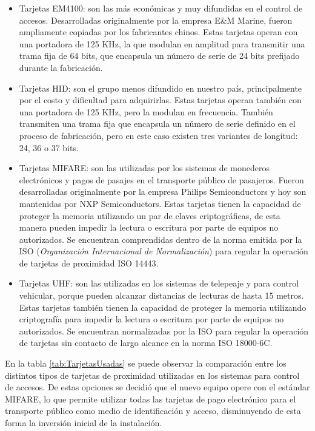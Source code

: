 \begin{itemize}
	\item Tarjetas EM4100: son las más económicas y muy difundidas en el control de accesos. Desarrolladas originalmente por la empresa E\&M Marine\cite{em_microelectronic_em4100_nodate}, fueron ampliamente copiadas por los fabricantes chinos. Estas tarjetas operan con una portadora de 125 KHz, la que modulan en amplitud para transmitir una trama fija de 64 bits, que encapsula un número de serie de 24 bits prefijado durante la fabricación.
	
	\item Tarjetas HID: son el grupo menos difundido en nuestro país, principalmente por el costo y dificultad para adquirirlas. Estas tarjetas operan también con una portadora de 125 KHz, pero la modulan en frecuencia. También transmiten una trama fija que encapsula un número de serie definido en el proceso de fabricación, pero en este caso existen tres variantes de longitud: 24, 36 o 37 bits\cite{hid_global_corporation_hid_nodate}.
	
	\item Tarjetas MIFARE: son las utilizadas por los sistemas de monederos electrónicos y pagos de pasajes en el transporte público de pasajeros. Fueron desarrolladas originalmente por la empresa Philips Semiconductors y hoy son mantenidas por NXP Semiconductors\cite{noauthor_mifare_2019}. Estas tarjetas tienen la capacidad de proteger la memoria utilizando un par de claves criptográficas, de esta manera pueden impedir la lectura o escritura por parte de equipos no autorizados. Se encuentran comprendidas dentro de la norma emitida por la ISO (\emph{Organización Internacional de Normalización}) para regular la operación de tarjetas de proximidad ISO 14443\cite{international_organization_for_standardization_iso_nodate}.
	
	\item Tarjetas UHF: son las utilizadas en los sistemas de telepeaje y para control vehicular, porque pueden alcanzar distancias de lecturas de hasta 15 metros. Estas tarjetas también tienen la capacidad de proteger la memoria utilizando criptografía para impedir la lectura o escritura por parte de equipos no autorizados. Se encuentran normalizadas por la ISO para regular la operación de tarjetas sin contacto de largo alcance en la norma ISO 18000-6C\cite{international_organization_for_standardization_isoiec_nodate}.
\end{itemize}

En la tabla \ref{tab:TarjetasUsadas} se puede observar la comparación entre los distintos tipos de tarjetas de proximidad utilizadas en los sistemas para control de accesos. De estas opciones se decidió que el nuevo equipo opere con el estándar MIFARE, lo que permite utilizar todas las tarjetas de pago electrónico para el transporte público como medio de identificación y acceso, disminuyendo de esta forma la inversión inicial de la instalación.

